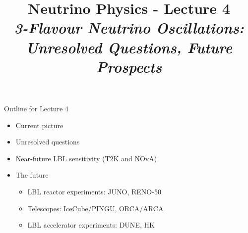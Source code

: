 \renewcommand{\thislecture}{4 }

%
%

\title[Neutrino Physics / Lecture \thislecture]
{
  {\huge \color{yellow} Neutrino Physics - Lecture \thislecture} \\
  {\it 3-Flavour Neutrino Oscillations:\\ Unresolved Questions, Future Prospects}\\
}



\begin{frame}[plain]
  \titlepage
\end{frame}

%
%

\begin{frame}{Outline for Lecture \thislecture}

\begin{itemize}
  \item Current picture
  \item Unresolved questions
  \item Near-future LBL sensitivity (T2K and NOvA)
  \item The future
  \begin{itemize}
    \item LBL reactor experiments: JUNO, RENO-50
    \item Telescopes: IceCube/PINGU, ORCA/ARCA
    \item LBL accelerator experiments: DUNE, HK
  \end{itemize}
\end{itemize}

\end{frame}

%
%
%

